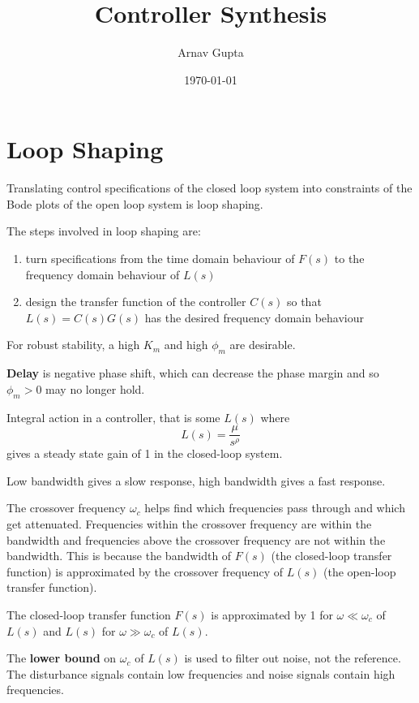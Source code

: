 \documentclass[11pt]{article}
\author{Arnav Gupta}
\date{\today}
\title{Controller Synthesis}
\begin{document}
\maketitle
\tableofcontents

\section{Loop Shaping}
\label{sec:orgc6e739b}
Translating control specifications of the closed loop system into constraints of the
Bode plots of the open loop system is loop shaping.

The steps involved in loop shaping are:
\begin{enumerate}
\item turn specifications from the time domain behaviour of \(F(s)\) to the frequency domain
behaviour of \(L(s)\)
\item design the transfer function of the controller \(C(s)\) so that \(L(s) = C(s)G(s)\) has the desired
frequency domain behaviour
\end{enumerate}

For robust stability, a high \(K_{m}\) and high \(\phi_{m}\) are desirable.

\textbf{Delay} is negative phase shift, which can decrease the phase margin and so
\(\phi_{m} > 0\) may no longer hold.

Integral action in a controller, that is some \(L(s)\) where
$$ L(s) = \frac{\mu}{s^{\rho}} $$
gives a steady state gain of 1 in the closed-loop system.

Low bandwidth gives a slow response, high bandwidth gives a fast response.

The crossover frequency \(\omega_{c}\) helps find which frequencies pass through and which get attenuated.
Frequencies within the crossover frequency are within the bandwidth and frequencies above the crossover
frequency are not within the bandwidth.
This is because the bandwidth of \(F(s)\) (the closed-loop transfer function) is approximated by
the crossover frequency of \(L(s)\) (the open-loop transfer function).

The closed-loop transfer function \(F(s)\) is approximated by 1 for \(\omega \ll \omega_{c}\) of \(L(s)\)
and \(L(s)\) for \(\omega \gg \omega_{c}\) of \(L(s)\).

The \textbf{lower bound} on \(\omega_{c}\) of \(L(s)\) is used to filter out noise, not the reference.
The disturbance signals contain low frequencies and noise signals contain high frequencies.
\end{document}
